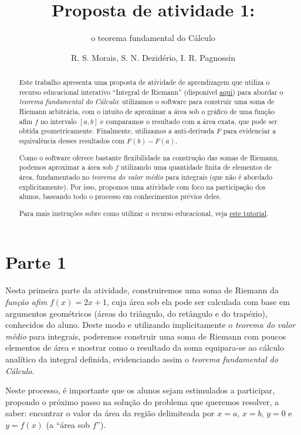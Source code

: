 \documentclass[a4paper,12pt]{scrartcl}
\title{Proposta de atividade 1:}
\subtitle{o teorema fundamental do Cálculo}
\author{R. S. Morais, S. N. Dezidério, I. R. Pagnossin}
\begin{document}
  \setlength\parindent{2em}

  \maketitle

  \begin{abstract}
    Este trabalho apresenta uma proposta de atividade de aprendizagem que utiliza o recurso educacional interativo ``Integral de Riemann'' (disponível \href{http://cepa-usp.github.io/AI-0170/}{aqui}) para abordar o \emph{teorema fundamental do Cálculo}: utilizamos o software para construir uma soma de Riemann arbitrária, com o intuito de aproximar a área sob o gráfico de uma função afim $f$ no intervalo $[a,b]$ e comparamos o resultado com a área exata, que pode ser obtida geometricamente. Finalmente, utilizamos a anti-derivada $F$ para evidenciar a equivalência desses resultados com $F(b) - F(a)$.
    
    Como o software oferece bastante flexibilidade na construção das somas de Riemann, podemos aproximar a área sob $f$ utilizando uma quantidade finita de elementos de área, fundamentado no \emph{teorema do valor médio} para integrais (que não é abordado explicitamente). Por isso, propomos uma atividade com foco na participação dos alunos, baseando todo o processo em conhecimentos prévios deles.
    
    Para mais instruções sobre como utilizar o recurso educacional, veja \href{http://www.youtube.com/watch?v=PJlPleMYuG4&t=22}{este tutorial}.
  \end{abstract}
  
  \section*{Parte 1}
  
    Nesta primeira parte da atividade, construiremos uma soma de Riemann da \emph{função afim} $f(x) = 2x + 1$, cuja área sob ela pode ser calculada com base em argumentos geométricos (áreas do triângulo, do retângulo e do trapézio), conhecidos do aluno. Deste modo e utilizando implicitamente o \emph{teorema do valor médio} para integrais, poderemos construir uma soma de Riemann com poucos elementos de área e mostrar como o resultado da soma equipara-se ao cálculo analítico da integral definida, evidenciando assim o \emph{teorema fundamental do Cálculo}.
    
    Neste processo, é importante que os alunos sejam estimulados a participar, propondo o próximo passo na solução do problema que queremos resolver, a saber: encontrar o valor da área da região delimiteada por $x = a$, $x = b$, $y = 0 $ e $y = f(x)$ (a ``área sob $f$'').
  
\end{document}
